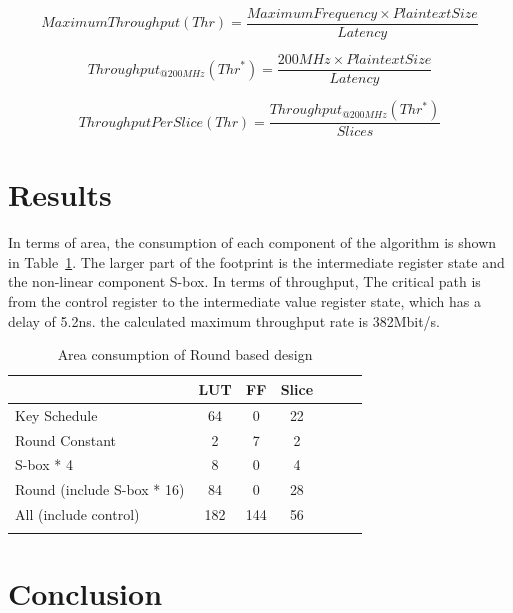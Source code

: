 \documentclass[sn-basic]{sn-jnl}%
\begin{document}
\begin{equation}
    Maximum Throughput(Thr) = \frac{Maximum Frequency \times Plaintext Size}{Latency} 
    \label{eq4}
\end{equation}

\begin{equation}
    Throughput_{@200MHz}(Thr^*) = \frac{200MHz \times Plaintext Size}{Latency} 
    \label{eq5}
\end{equation}

\begin{equation}
    ThroughputPerSlice(Thr) = \frac{Throughput_{@200MHz}(Thr^*)}{Slices} 
    \label{eq6}
\end{equation}

\section{Results}\label{sec5}

In terms of area, the consumption of each component of the algorithm is shown in Table~\ref{area_cost_round_based}.
The larger part of the footprint is the intermediate register state and the non-linear component S-box.
In terms of throughput, The critical path is from the control register to the intermediate value register state, which has a delay of 5.2ns. the calculated maximum throughput rate is 382Mbit/s.

\begin{table}[h]
    \caption{Area consumption of Round based design}\label{area_cost_round_based}%
    \begin{tabular*}{\textwidth}{@{\extracolsep\fill}lcccccc}
        \toprule
        &LUT&	FF&	Slice                                \\
        \midrule
        Key Schedule &	64&	0&	22                           \\
        Round Constant&	2&	7&	2 \\
        S-box * 4&	8&	0&	4                             \\
        Round (include  S-box * 16)&	84&	0&	28                        \\
        All (include control)&	182&	144&	56                     \\
        \botrule
    \end{tabular*}
\end{table}

\section{Conclusion}\label{sec6}

\end{document}
